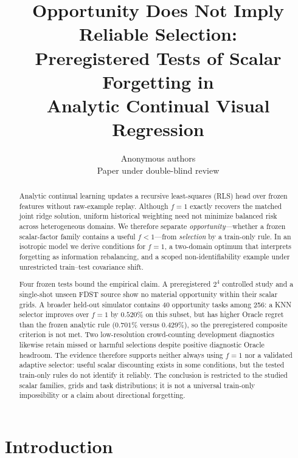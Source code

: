 \documentclass[10pt]{article}
\title{Opportunity Does Not Imply Reliable Selection:\\
Preregistered Tests of Scalar Forgetting in\\
Analytic Continual Visual Regression}
\author{\name Anonymous authors\\
  \addr Paper under double-blind review}
\begin{document}
\maketitle

\begin{abstract}
Analytic continual learning updates a recursive least-squares (RLS) head over
frozen features without raw-example replay.  Although $f=1$ exactly recovers
the matched joint ridge solution, uniform historical weighting need not
minimize balanced risk across heterogeneous domains.  We therefore separate
\emph{opportunity}---whether a frozen scalar-factor family contains a useful
$f<1$---from \emph{selection} by a train-only rule.  In an isotropic model we
derive conditions for $f=1$, a two-domain optimum that interprets forgetting as
information rebalancing, and a scoped non-identifiability example under
unrestricted train--test covariance shift.

Four frozen tests bound the empirical claim.  A preregistered $2^4$ controlled
study and a single-shot unseen FDST source show no material opportunity within
their scalar grids.  A broader held-out simulator contains 40 opportunity
tasks among 256: a KNN selector improves over $f=1$ by $0.520\%$ on this subset,
but has higher Oracle regret than the frozen analytic rule ($0.701\%$ versus
$0.429\%$), so the preregistered composite criterion is not met.  Two
low-resolution crowd-counting development diagnostics likewise retain missed
or harmful selections despite positive diagnostic Oracle headroom.  The
evidence therefore supports neither always using $f=1$ nor a validated
adaptive selector: useful scalar discounting exists in some conditions, but
the tested train-only rules do not identify it reliably.  The conclusion is
restricted to the studied scalar families, grids and task distributions; it
is not a universal train-only impossibility or a claim about directional
forgetting.
\end{abstract}

\section{Introduction}
\label{sec:intro}
\end{document}

